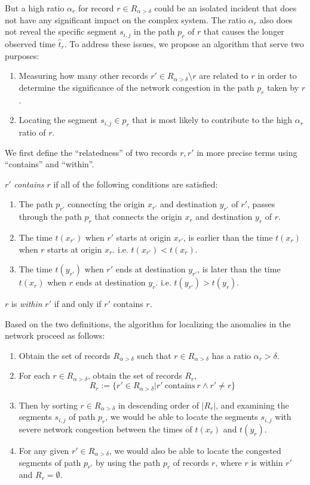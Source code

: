 \documentclass[draft]{sig-alternate}
\begin{document}
But a high ratio $\alpha_r$ for record $r \in R_{\alpha > \delta}$ could be an isolated incident that does not have any significant impact on the complex system. The ratio $\alpha_r$ also does not reveal the specific segment $s_{i,j}$ in the path $p_r$ of $r$ that causes the longer observed time $\hat{t}_r$. To address these issues, we propose an algorithm that serve two purposes:
\begin{enumerate}
	\item Measuring how many other records $r' \in R_{\alpha > \delta}\setminus{r}$ are related to $r$ in order to determine the significance of the network congestion in the path $p_r$ taken by $r$.
	\item Locating the segment $s_{i,j} \in p_r$ that is most likely to contribute to the high $\alpha_r$ ratio of $r$.
\end{enumerate}
We first define the ``relatedness'' of two records $r, r'$ in more precise terms using ``contains'' and ``within''.
\begin{definition}
	$r'$ \emph{contains} $r$ if all of the following conditions are satisfied: 
	\begin{enumerate}
		\item The path $p_{r'}$ connecting the origin $x_{r'}$ and destination $y_{r'}$ of $r'$, passes through the path $p_{r}$ that connects the origin $x_{r}$ and destination $y_{r}$ of $r$. 
		\item The time $t(x_{r'})$ when $r'$ starts at origin $x_{r'}$, is earlier than the time $t(x_{r})$ when $r$ starts at origin $x_{r}$. i.e. $t(x_{r'}) < t(x_{r})$.
		\item The time $t(y_{r'})$ when $r'$ ends at destination $y_{r'}$, is later than the time $t(x_{r})$ when $r$ ends at destination $y_{r}$. i.e. $t(y_{r'}) > t(y_{r})$.
	\end{enumerate}
\end{definition}
\begin{definition}
	$r$ is \emph{within} $r'$ if and only if $r'$ contains $r$.
\end{definition}
Based on the two definitions, the algorithm for localizing the anomalies in the network proceed as follows:
\begin{enumerate}
	\item Obtain the set of records $R_{\alpha > \delta}$ such that $r \in R_{\alpha > \delta}$ has a ratio $\alpha_r > \delta$.
	\item For each $r \in R_{\alpha > \delta}$, obtain the set of records $R_r$,
	\[ R_{r} := \{ r' \in R_{\alpha > \delta} | r' ~ \text{contains} ~ r \land r' \neq r \} \]
	\item Then by sorting $r \in R_{\alpha > \delta}$ in descending order of $|R_r|$, and examining the segments $s_{i,j}$ of path $p_r$, we would be able to locate the segments $s_{i,j}$ with severe network congestion between the times of $t(x_r)$ and $t(y_r)$.
	\item For any given $r' \in R_{\alpha > \delta}$, we would also be able to locate the congested segments of path $p_{r'}$ by using the path $p_r$ of records $r$, where $r$ is within $r'$ and $R_r = \emptyset$.
\end{enumerate}
\end{document}
